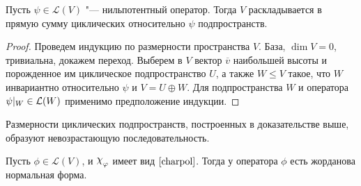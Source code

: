 \begin{corollary}
	Пусть $\psi \in \mathcal{L}(V)$ "--- нильпотентный оператор. Тогда $V$ раскладывается в прямую сумму циклических относительно $\psi$ подпространств.
\end{corollary}

\begin{proof}
	Проведем индукцию по размерности пространства $V$. База, $\dim{V} = 0$, тривиальна, докажем переход. Выберем в $V$ вектор $\overline{v}$ наибольшей высоты и порожденное им циклическое подпространство $U$, а также $W \le V$ такое, что $W$ инвариантно относительно $\psi$ и  $V = U \oplus W$. Для подпространства $W$ и оператора $\psi|_W \in \mathcal L(W)$ применимо предположение индукции.
\end{proof}

\begin{note}
	Размерности циклических подпространств, построенных в доказательстве выше, образуют невозрастающую последовательность.
\end{note}

\begin{theorem}
	Пусть $\phi \in \mathcal{L}(V)$, и $\Chi_\phi$ имеет вид $\eqref*{charpol}$. Тогда у оператора $\phi$ есть жорданова нормальная форма.
\end{theorem}

